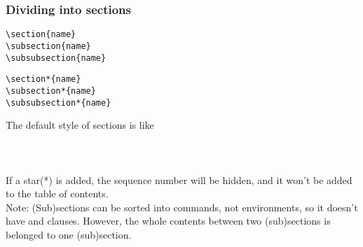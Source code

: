 \begin{frame}[fragile]
	\frametitle{Dividing into sections}
	\begin{command}
	\begin{multicols}{2}
		\begin{verbatim}
\section{name}
\subsection{name}
\subsubsection{name}
		\end{verbatim}
		\begin{verbatim}
\section*{name}
\subsection*{name}
\subsubsection*{name}
		\end{verbatim}
	\end{multicols}
	\end{command}
	The default style of sections is like\\
	\\
	\\
	\\[0.5em]
	If a star(\alert{*}) is added, the sequence number will be hidden, and it won't be added to the table of contents.\\
	\alert{Note:} (Sub)sections can be sorted into commands, not environments, so it doesn't have \LC{\begin} and \LC{\end} clauses. However, the whole contents between two (sub)sections is belonged to one (sub)section.
\end{frame}

